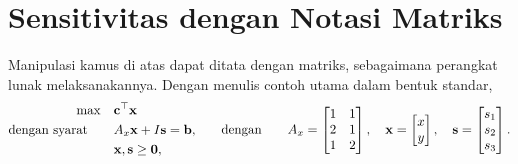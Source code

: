 \section{Sensitivitas dengan Notasi Matriks}
\label{sec:sensitivity-matrix}

Manipulasi kamus di atas dapat ditata dengan matriks, sebagaimana perangkat lunak melaksanakannya. Dengan menulis contoh utama dalam bentuk standar,
\[
\begin{aligned}
\max \quad & \mathbf{c}^\top \mathbf{x} \\
\mbox{dengan syarat}\quad \quad & A_x\mathbf{x} + I\mathbf{s}  = \mathbf{b}, \\
& \mathbf{x}, \mathbf{s} \geq \mathbf{0},
\end{aligned}
\qquad\mbox{dengan}\qquad
A_x =
\begin{bmatrix}
1 & 1 \\
2 & 1 \\
1 & 2
\end{bmatrix},
\quad
\mathbf{x} =
\begin{bmatrix}
x \\
y \\
\end{bmatrix},
\quad
\mathbf{s} =
\begin{bmatrix}
s_1 \\
s_2 \\
s_3
\end{bmatrix}.
\]

